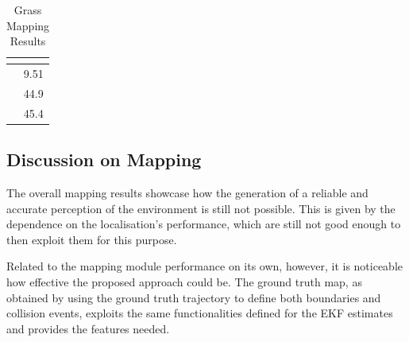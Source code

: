 \begin{table}[!ht]
	\small
	\begin{center}
		\begin{tabular}{|c||S[table-format=-1.2]|}
			\hline
			 & \\
			\hline
			\hline
			 & 9.51    \\
			\hline
			 & 44.9  \\
			\hline
			 & 45.4  \\
			\hline
		\end{tabular}
		\caption{Grass Mapping Results
		\label{tab:map-grass}}
	\end{center}
\end{table}

\subsection{Discussion on Mapping}
\noindent
The overall mapping results showcase how the generation of a reliable and accurate perception of the environment is still not possible.
This is given by the dependence on the localisation's performance, which are still not good enough to then exploit them for this purpose.

Related to the mapping module performance on its own, however, it is noticeable how effective the proposed approach could be.
The ground truth map, as obtained by using the ground truth trajectory to define both boundaries and collision events, exploits the same functionalities defined for the \gls{EKF} estimates and provides the features needed.


\cleardoublepage
